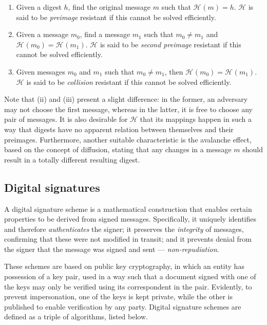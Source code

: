 \documentclass[12pt]{article}
\newcommand{\hh}{\mathcal{H}}
\newcommand{\hash}[2][]{\mathcal{H}^{#1} (#2)}
\begin{document}
\begin{enumerate}[label= (\roman*)]
  \item Given a digest $h$, find the original message $m$ such that
    $\hash{m} = h$. $\hh{}$ is said to be \emph{preimage} resistant if
    this cannot be solved efficiently.
  \item Given a message $m_0$, find a message $m_1$ such that $m_0 \neq m_1$
    and $\hash{m_0} = \hash{m_1}$. $\hh{}$ is said to be \emph{second preimage}
    resistant if this cannot be solved efficiently.
  \item Given messages $m_0$ and $m_1$ such that $m_0 \neq m_1$, then
    $\hash{m_0} = \hash{m_1}$. $\hh{}$ is said to be \emph{collision} resistant
    if this cannot be solved efficiently.
\end{enumerate}

Note that (ii) and (iii) present a slight difference: in the former, an
adversary may not choose the first message, whereas in the latter, it is free
to choose any pair of messages. It is also desirable for $\hh{}$ that its
mappings happen in such a way that digests have no apparent relation between
themselves and their preimages. Furthermore, another suitable characteristic is
the avalanche effect, based on the concept of diffusion, stating that any
changes in a message $m$ should result in a totally different resulting digest.

\subsection*{Digital signatures}

A digital signature scheme is a mathematical construction that enables certain
properties to be derived from signed messages. Specifically, it uniquely
identifies and therefore \emph{authenticates} the signer; it preserves the
\emph{integrity} of messages, confirming that these were not modified in
transit; and it prevents denial from the signer that the message was signed and
sent --- \emph{non-repudiation}.

These schemes are based on public key cryptography, in which an entity has
possession of a key pair, used in a way such that a document signed with one of
the keys may only be verified using its correspondent in the pair. Evidently,
to prevent impersonation, one of the keys is kept private, while the other is
published to enable verification by any party. Digital signature schemes are
defined as a triple of algorithms, listed below.
\end{document}
